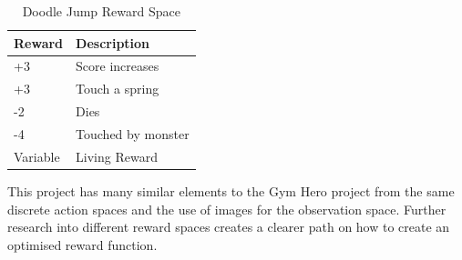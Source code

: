 \documentclass[a4paper,12pt]{article}
\begin{document}
\begin{table}[H]
\centering
\caption{Doodle Jump Reward Space}
\label{tab:Doodle Jump Reward Space}
\begin{tabular}{|ll|}
\hline
\textbf{Reward} & \textbf{Description}\\ \hline
+3 & Score increases \\ 
+3 & Touch a spring \\ 
-2 & Dies \\ 
-4 & Touched by monster \\ 
 Variable & Living Reward \\ \hline
\end{tabular}
\end{table}
\noindent
This project has many similar elements to the Gym Hero project from the same discrete action spaces and the use of images for the observation space. Further research into different reward spaces creates a clearer path on how to create an optimised reward function.
\\\\
\end{document}
